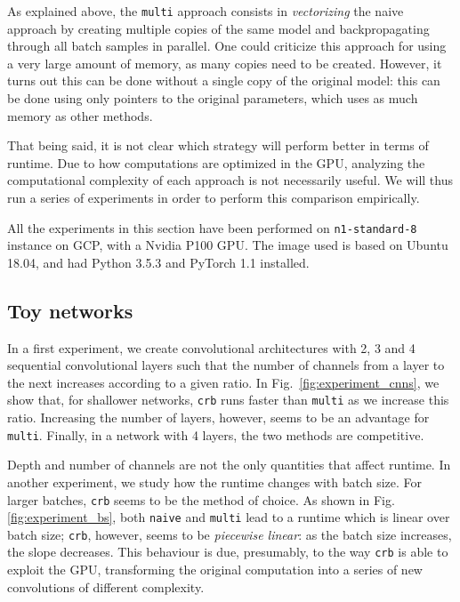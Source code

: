 \documentclass[11pt]{article}
\begin{document}
As explained above, the \texttt{multi} approach consists in
\emph{vectorizing} the naive approach by creating multiple copies of the same
model and backpropagating through all batch samples in parallel. One
could criticize this approach for using a very large amount of
memory, as many copies need to be created. However, it turns out this can
be done without a single copy of the original model: this can be done using
only pointers to the original parameters, which uses as much memory as other
methods.

That being said, it is not clear which strategy will perform better in terms
of runtime. Due to how computations are optimized in the GPU, analyzing the
computational complexity of each approach is not necessarily useful. We will
thus run a series of experiments in order to perform this comparison
empirically.

All the experiments in this section have been performed on \texttt{n1-standard-8}
instance on GCP, with a Nvidia P100 GPU. The image used is based on Ubuntu 18.04,
and had Python 3.5.3 and PyTorch 1.1 installed.

\subsection{Toy networks}

In a first experiment, we create convolutional architectures with 2, 3 and 4
sequential convolutional layers such that the number of channels from a layer to the next increases
according to a given ratio. In Fig.~\ref{fig:experiment_cnns}, we show
that, for shallower networks, \texttt{crb} runs faster than \texttt{multi}
as we increase this ratio. Increasing the number of layers, however, 
seems to be an advantage for \texttt{multi}. Finally, in a network with 4
layers, the two methods are competitive.

Depth and number of channels are not the only quantities that affect runtime. In
another experiment, we study how the runtime changes with batch size. For larger
batches, \texttt{crb} seems to be the method of choice. As shown in Fig.~
\ref{fig:experiment_bs}, both \texttt{naive} and \texttt{multi} lead to
a runtime which is linear over batch size; \texttt{crb}, however, seems to
be \emph{piecewise linear}: as the batch size increases, the slope
decreases. This behaviour is due, presumably, to the way \texttt{crb} is
able to exploit the GPU, transforming the original computation into a series
of new convolutions of different complexity.
\end{document}
